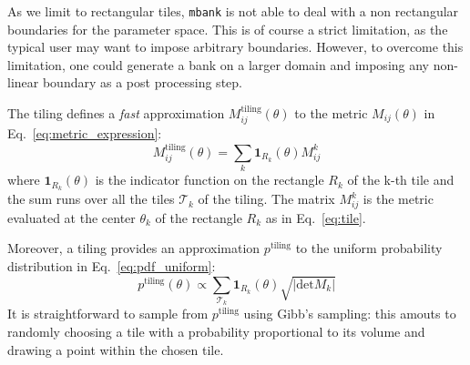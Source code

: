 \documentclass[twocolumn,showpacs,preprintnumbers,nofootinbib,prd,
superscriptaddress,10pt]{revtex4-2}
\begin{document}
As we limit to rectangular tiles, \texttt{mbank} is not able to deal with a non rectangular boundaries for the parameter space. This is of course a strict limitation, as the typical user may want to impose arbitrary boundaries. However, to overcome this limitation, one could generate a bank on a larger domain and imposing any non-linear boundary as a post processing step.

The tiling defines a {\it fast} approximation $M^{\text{tiling}}_{ij}(\theta)$ to the metric $M_{ij}(\theta)$ in Eq.~\eqref{eq:metric_expression}:
\begin{equation}\label{eq:metric_tiling}
	M^\text{tiling}_{ij}(\theta) = \sum_{k} \mathbf{1}_{R_k}(\theta) M^{k}_{ij}
\end{equation}
where $\mathbf{1}_{R_k}(\theta)$ is the indicator function on the rectangle $R_k$ of the k-th tile and the sum runs over all the tiles $\mathcal{T}_k$ of the tiling. The matrix $M^{k}_{ij}$ is the metric evaluated at the center $\theta_k$ of the rectangle $R_k$ as in Eq.~\eqref{eq:tile}.

Moreover, a tiling provides an approximation $p^{\text{tiling}}$ to the uniform probability distribution in Eq.~\eqref{eq:pdf_uniform}:
\begin{equation}\label{eq:tiling_pdf}
	p^{\text{tiling}}(\theta) \propto \sum_{\mathcal{T}_k} \mathbf{1}_{R_k}(\theta) \sqrt{|\text{det} M_k|}
\end{equation}
It is straightforward to sample from $p^{\text{tiling}}$ using Gibb's sampling: this amouts to randomly choosing a tile with a probability proportional to its volume and drawing a point within the chosen tile.

\end{document}
